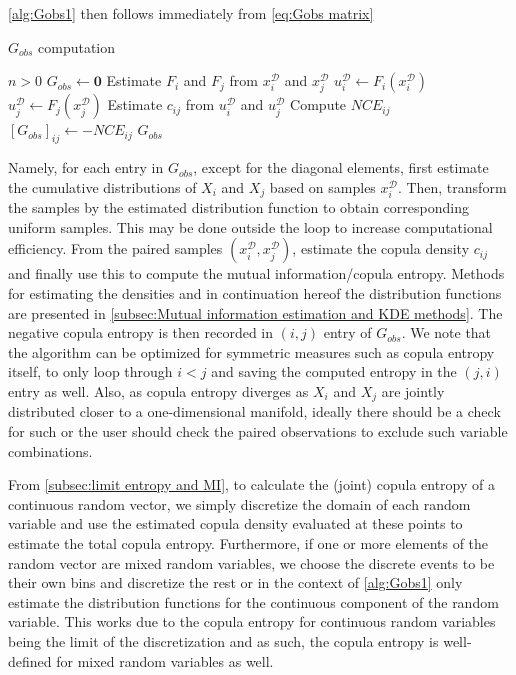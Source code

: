 \documentclass[../Thesis.tex]{subfiles}
\begin{document}
\autoref{alg:Gobs1} then follows immediately from \autoref{eq:Gobs matrix}
\begin{algorithm}[H]
    \caption{$G_{obs}$ computation}\label{alg:Gobs1}
    \begin{algorithmic}
        \Require $n > 0$             
        \State $G_{obs} \gets \boldsymbol 0$
        \State Estimate $F_i$ and $F_j$ from $x_i^{\mathcal{D}}$ and $x_j^{\mathcal{D}}$
        \State $u_i^{\mathcal{D}} \gets F_i(x_i^{\mathcal{D}})$
        \State $u_j^{\mathcal{D}} \gets F_j(x_j^{\mathcal{D}})$
        \State Estimate $c_{ij}$ from $u_i^{\mathcal{D}}$ and $u_j^{\mathcal{D}}$
        \State Compute $NCE_{ij}$
        \State $\left[G_{obs}\right]_{ij} \gets -NCE_{ij}$
        \EndFor
        \State \Return $G_{obs}$
    \end{algorithmic}
\end{algorithm}
Namely, for each entry in $G_{obs}$, except for the diagonal elements, first estimate the cumulative distributions of $X_i$ and $X_j$ based on samples $x_i^{\mathcal{D}}$. Then, transform the samples by the estimated distribution function to obtain corresponding uniform samples. This may be done outside the loop to increase computational efficiency. From the paired samples $(x_i^{\mathcal{D}},x_j^{\mathcal{D}})$, estimate the copula density $c_{ij}$ and finally use this to compute the mutual information/copula entropy. Methods for estimating the densities and in continuation hereof the distribution functions are presented in \autoref{subsec:Mutual information estimation and KDE methods}. The negative copula entropy is then recorded in $(i,j)$ entry of $G_{obs}$. We note that the algorithm can be optimized for symmetric measures such as copula entropy itself, to only loop through $i<j$ and saving the computed entropy in the $(j,i)$ entry as well. Also, as copula entropy diverges as $X_i$ and $X_j$ are jointly distributed closer to a one-dimensional manifold, ideally there should be a check for such or the user should check the paired observations to exclude such variable combinations.

From \autoref{subsec:limit entropy and MI}, to calculate the (joint) copula entropy of a continuous random vector, we simply discretize the domain of each random variable and use the estimated copula density evaluated at these points to estimate the total copula entropy. Furthermore, if one or more elements of the random vector are mixed random variables, we choose the discrete events to be their own bins and discretize the rest or in the context of \autoref{alg:Gobs1} only estimate the distribution functions for the continuous component of the random variable. This works due to the copula entropy for continuous random variables being the limit of the discretization and as such, the copula entropy is well-defined for mixed random variables as well.
\end{document}
